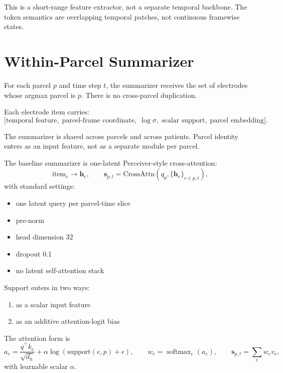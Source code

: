 \documentclass[11pt,letterpaper]{article}
\newcommand{\bh}{\mathbf{h}}
\newcommand{\bs}{\mathbf{s}}
\begin{document}
This is a short-range feature extractor, not a separate temporal backbone. The token semantics are overlapping temporal patches, not continuous framewise states.


\section{Within-Parcel Summarizer}

For each parcel $p$ and time step $t$, the summarizer receives the set of electrodes whose argmax parcel is $p$. There is no cross-parcel duplication.

Each electrode item carries:
\begin{equation}
\bigl[\text{temporal feature},\; \text{parcel-frame coordinate},\; \log\sigma,\; \text{scalar support},\; \text{parcel embedding}\bigr].
\end{equation}

The summarizer is shared across parcels and across patients. Parcel identity enters as an input feature, not as a separate module per parcel.

The baseline summarizer is one-latent Perceiver-style cross-attention:
\begin{equation}
\text{item}_e \rightarrow \bh_e,
\qquad
\bs_{p,t} = \text{CrossAttn}(q_p, \{\bh_e\}_{e \in p,t}),
\end{equation}
with standard settings:
\begin{itemize}[leftmargin=2em, itemsep=0.2em]
\item one latent query per parcel-time slice
\item pre-norm
\item head dimension 32
\item dropout 0.1
\item no latent self-attention stack
\end{itemize}

Support enters in two ways:
\begin{enumerate}[leftmargin=2em, itemsep=0.2em]
\item as a scalar input feature
\item as an additive attention-logit bias
\end{enumerate}

The attention form is
\begin{equation}
a_e = \frac{q^\top k_e}{\sqrt{d_h}} + \alpha \log(\text{support}(e,p) + \epsilon),
\qquad
w_e = \operatorname{softmax}_e(a_e),
\qquad
\bs_{p,t} = \sum_e w_e v_e,
\end{equation}
with learnable scalar $\alpha$.
\end{document}
